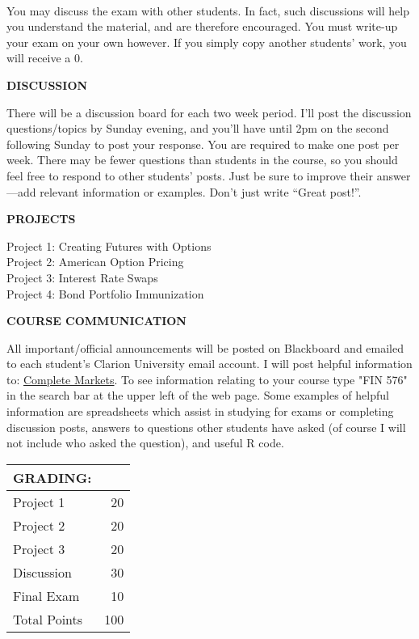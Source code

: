 \documentclass[11pt]{article}
\begin{document}
\\
You may discuss the exam with other students.  In fact, such discussions will help you understand the material, and are therefore encouraged.  You must write-up your exam on your own however.  If you simply copy another students' work, you will receive a 0.
\begin{center}
\textbf{DISCUSSION}
\end{center}
There will be a discussion board for each two week period.  I'll post the discussion questions/topics by Sunday evening, and you'll have until 2pm on the second following Sunday to post your response.  You are required to make one post per week.  There may be fewer questions than students in the course, so you should feel free to respond to other students' posts.  Just be sure to improve their answer---add relevant information or examples.  Don't just write ``Great post!''.  
\begin{center}
\textbf{PROJECTS}
\end{center}
Project 1:  Creating Futures with Options\\
Project 2:  American Option Pricing \\
Project 3:  Interest Rate Swaps \\
Project 4:  Bond Portfolio Immunization
\begin{center}
\textbf{COURSE COMMUNICATION}
\end{center}
All important/official announcements will be posted on Blackboard and emailed to each student's Clarion University email account.  I will post helpful information to: \href{http://www.complete-markets.com}{Complete Markets}. To see information relating to your course type "FIN 576" in the search bar at the upper left of the web page.  Some examples of helpful information are spreadsheets which assist in studying for exams or completing discussion posts, answers to questions other students have asked (of course I will not include who asked the question), and useful R code.

\begin{center}
\begin{tabular}{lr}
\textbf{GRADING:} & \\
\hline
Project 1 & 20\\
Project 2 & 20\\
Project 3 & 20\\
Discussion & 30\\
Final Exam & 10\\
Total Points & 100\\
\hline
\end{tabular}
\end{center}
\end{document}
